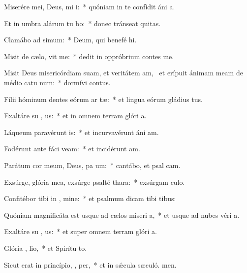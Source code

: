 \item Miserére mei, Deus, mi i:~* quóniam in te confídit áni a.
\item Et in umbra alárum tu bo:~* donec tránseat quitas.
\item Clamábo ad  simum:~* Deum, qui benefé hi.
\item Misit de cælo,  vit me:~* dedit in oppróbrium contes me.
\item Misit Deus misericórdiam suam, et veritátem am,~\pscross{} et erípuit ánimam meam de médio catu num:~* dormívi contus.
\item Fílii hóminum dentes eórum ar  tæ:~* et lingua eórum gládius tus.
\item Exaltáre su , us:~* et in omnem terram glóri a.
\item Láqueum paravérunt  is:~* et incurvavérunt áni am.
\item Fodérunt ante fáci  veam:~* et incidérunt  am.
\item Parátum cor meum, Deus, pa  um:~* cantábo, et psal cam.
\item Exsúrge, glória mea, exsúrge psalté  thara:~* exsúrgam culo.
\item Confitébor tibi in , mine:~* et psalmum dicam tibi  tibus:
\item Quóniam magnificáta est usque ad cælos miseri a,~* et usque ad nubes véri a.
\item Exaltáre su , us:~* et super omnem terram glóri a.
\item Glória ,  lio,~* et Spirítu to.
\item Sicut erat in princípio,  ,  per,~* et in sǽcula sæculó. men.
